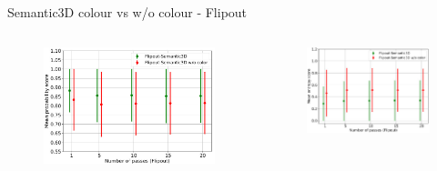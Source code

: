 \documentclass[aspectratio=169]{beamer}
\begin{document}
\begin{frame}{Semantic3D colour vs w/o colour - Flipout}
    \begin{columns}
        \begin{column}{0.5\textwidth}
            \begin{figure}
                \centering
                \includegraphics[scale=0.28]{images/ood2/Fout_MSP_OOD2.jpg}
            \end{figure}
        \end{column}
        \begin{column}{0.5\textwidth}
            \begin{figure}
                \centering
                \includegraphics[scale=0.38]{images/ood2/Fout_Ent_OOD2.jpg}
            \end{figure}
        \end{column}
    \end{columns}
\end{frame}
\end{document}

